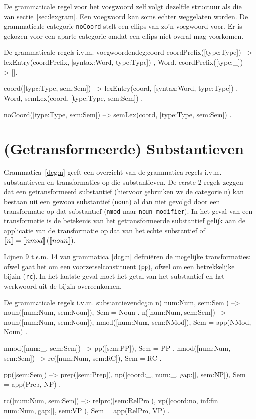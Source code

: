 De grammaticale regel voor het voegwoord zelf volgt dezelfde structuur als die van sectie~\ref{sec:lexgram}. Een voegwoord kan soms echter weggelaten worden. De grammaticale categorie \texttt{noCoord} stelt een ellips van zo'n voegwoord voor. Er is gekozen voor een aparte categorie omdat een ellips niet overal mag voorkomen.
\begin{dcg}{De grammaticale regels i.v.m. voegwoorden}{dcg:coord}
coordPrefix([type:Type]) -->
  { lexEntry(coordPrefix, [syntax:Word, type:Type]) },
  Word.
coordPrefix([type:_]) -->
  [].

coord([type:Type, sem:Sem]) -->
  { lexEntry(coord, [syntax:Word, type:Type]) },
  Word,
  { semLex(coord, [type:Type, sem:Sem]) }.

noCoord([type:Type, sem:Sem]) -->
  { semLex(coord, [type:Type, sem:Sem]) }.
\end{dcg} 

\section{(Getransformeerde) Substantieven}
Grammatica~\ref{dcg:n} geeft een overzicht van de grammatica regels i.v.m. substantieven en transformaties op die substantieven. De eerste 2 regels zeggen dat een getransformeerd substantief (hiervoor gebruiken we de categorie \texttt{n}) kan bestaan uit een gewoon substantief (\texttt{noun}) al dan niet gevolgd door een transformatie op dat substantief (\texttt{nmod} naar \texttt{noun modifier}). In het geval van een transformatie is de betekenis van het getransformeerde substantief gelijk aan de applicatie van de transformatie op dat van het echte substantief of $\llbracket n\rrbracket = \llbracket nmod\rrbracket \left( \llbracket noun\rrbracket \right)$.

Lijnen 9 t.e.m. 14 van grammatica~\ref{dcg:n} definiëren de mogelijke transformaties: ofwel gaat het om een voorzetselconstituent (\texttt{pp}), ofwel om een betrekkelijke bijzin (\texttt{rc}). In het laatste geval moet het getal van het substantief en het werkwoord uit de bijzin overeenkomen.

\begin{dcg}{De grammaticale regels i.v.m. substantieven}{dcg:n}
n([num:Num, sem:Sem]) -->
  noun([num:Num, sem:Noun]),
  { Sem = Noun }.
n([num:Num, sem:Sem]) -->
  noun([num:Num, sem:Noun]),
  nmod([num:Num, sem:NMod]),
  { Sem = app(NMod, Noun) }.

nmod([num:_, sem:Sem]) -->
  pp([sem:PP]),
  { Sem = PP }.
nmod([num:Num, sem:Sem]) -->
  rc([num:Num, sem:RC]),
  { Sem = RC }.

pp([sem:Sem]) -->
  prep([sem:Prep]),
  np([coord:_, num:_, gap:[], sem:NP]),
  { Sem = app(Prep, NP) }.

rc([num:Num, sem:Sem]) -->
  relpro([sem:RelPro]),
  vp([coord:no, inf:fin, num:Num, gap:[], sem:VP]),
  { Sem = app(RelPro, VP) }.
\end{dcg}

